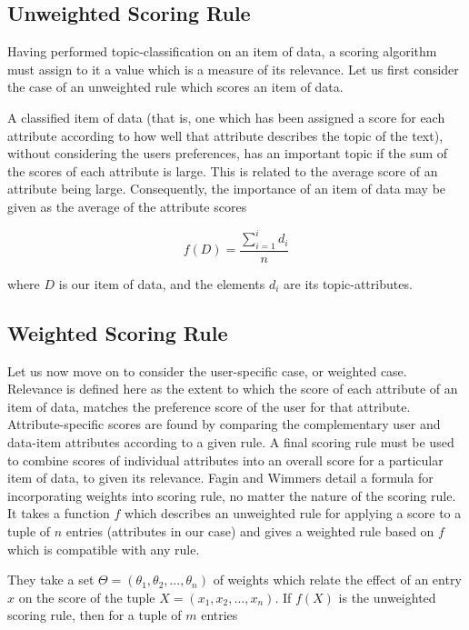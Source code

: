\subsection{Unweighted Scoring Rule}

Having performed topic-classification on an item of data, a scoring algorithm must assign to it a value which is a measure of its relevance. Let us first consider the case of an unweighted rule which scores an item of data. 

A classified item of data (that is, one which has been assigned a score for each attribute according to how well that attribute describes the topic of the text), without considering the users preferences, has an important topic if the sum of the scores of each attribute is large. This is related to the average score of an attribute being large. Consequently, the importance of an item of data may be given as the average of the attribute scores

\begin{equation}\label{AverageUnweightedRule}	
	f(D) = \frac{\sum_{i=1}^{i} d_i}{n}
\end{equation}

where $D$ is our item of data, and the elements $d_i$ are its topic-attributes. 

\subsection{Weighted Scoring Rule}

Let us now move on to consider the user-specific case, or weighted case. Relevance is defined here as the extent to which the score of each attribute of an item of data, matches the preference score of the user for that attribute. Attribute-specific scores are found by comparing the complementary user and data-item attributes according to a given rule. A final scoring rule must be used to combine scores of individual attributes into an overall score for a particular item of data, to given its relevance.
Fagin and Wimmers \cite{FaginWimmers1} detail a formula for incorporating weights into scoring rule, no matter the nature of the scoring rule. It takes a function $f$ which describes an unweighted rule for applying a score to a tuple of $n$ entries (attributes in our case) and gives a weighted rule based on $f$ which is compatible with any rule. 

They take a set $\Theta = (\theta_1,\theta_2,\dotsc,\theta_n)$ of weights which relate the effect of an entry $x$ on the score of the tuple $ X = (x_1, x_2, \dots, x_n)$. If $f(X)$ is the unweighted scoring rule, then for a tuple of $m$ entries


